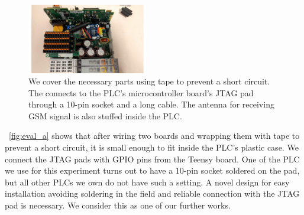 \begin{figure}[th]
	\includegraphics[width=0.47\textwidth]{figures/eval_a}
	\centering
	\caption{We cover the necessary parts using tape to prevent a short circuit. The \name connects to the PLC's microcontroller board's JTAG pad through a 10-pin socket and a long cable. The antenna for receiving GSM signal is also stuffed inside the PLC.}
	\label{fig:eval_a}
\end{figure}

~\autoref{fig:eval_a} shows that after wiring two boards and wrapping them with tape to prevent a short circuit, it is small enough to fit inside the PLC's plastic case. We connect the JTAG pads with GPIO pins from the Teensy board. One of the PLC we use for this experiment turns out to have a 10-pin socket soldered on the pad, but all other PLCs we own do not have such a setting. A novel design for easy installation avoiding soldering in the field and reliable connection with the JTAG pad is necessary. We consider this as one of our further works.

